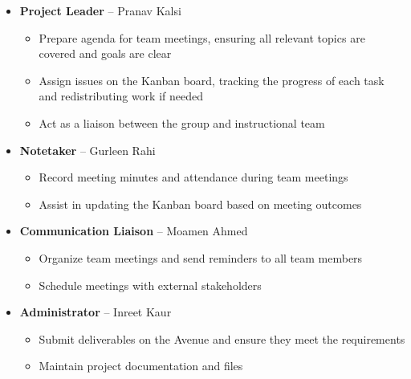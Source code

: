 \documentclass{article}
\begin{document}
\begin{itemize}
\item \textbf{Project Leader} -- Pranav Kalsi
\begin{itemize}
\item Prepare agenda for team meetings, ensuring all relevant topics are covered and goals are clear
\item Assign issues on the Kanban board, tracking the progress of each task and redistributing work if needed
\item Act as a liaison between the group and instructional team
\end{itemize}

\item \textbf{Notetaker} -- Gurleen Rahi
\begin{itemize}
\item Record meeting minutes and attendance during team meetings
\item Assist in updating the Kanban board based on meeting outcomes
\end{itemize}

\item \textbf{Communication Liaison} -- Moamen Ahmed
\begin{itemize}
\item Organize team meetings and send reminders to all team members
\item Schedule meetings with external stakeholders
\end{itemize}

\item \textbf{Administrator} -- Inreet Kaur
\begin{itemize}
\item Submit deliverables on the Avenue and ensure they meet the requirements
\item Maintain project documentation and files
\end{itemize}
\end{itemize} 
\end{document}
